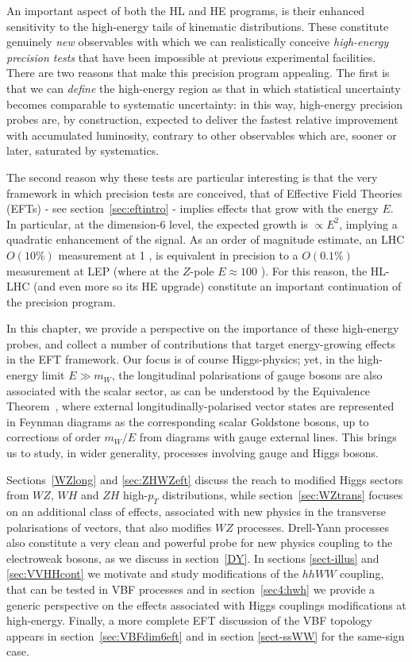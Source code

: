 An important aspect of both the HL and HE programs, is their enhanced sensitivity to the high-energy tails of kinematic distributions.  
These constitute genuinely \emph{new} observables with which we can realistically  conceive \emph{high-energy precision tests} that have been impossible at previous experimental facilities.
 There are two reasons that make this precision program appealing. The first is that we can \emph{define} the high-energy region as that in which statistical uncertainty becomes comparable to systematic uncertainty: in this way, high-energy precision probes are, by construction, expected to deliver the fastest relative improvement with accumulated luminosity, contrary to other observables which are, sooner or later, saturated by systematics.

The second reason why these tests are particular interesting is that the very framework in which precision tests are conceived, that of Effective Field Theories (EFTs) -   see section~\ref{sec:eftintro} -  implies effects that grow with the energy $E$. In particular, at the dimension-6 level, the expected growth is $\propto E^2$, implying a quadratic enhancement of the signal. 
As an order of magnitude estimate, an LHC $O(10\%)$ measurement at 1 \UTeV, is equivalent in precision to a $O(0.1\%)$ measurement at LEP (where at the $Z$-pole $E\approx 100$ \UGeV). For this reason, the HL-LHC (and even more so its HE upgrade) constitute an important continuation of the precision program. 

In this chapter, we provide a perspective on the importance of these high-energy probes, and collect a number of contributions that target energy-growing effects in the EFT framework.
Our focus is of course Higgs-physics; yet, in the  high-energy  limit $E\gg m_{W}$, the longitudinal polarisations of gauge bosons are also associated with the scalar sector, as can be understood by the Equivalence Theorem~\cite{Chanowitz:1985hj,Wulzer:2013mza}, where external longitudinally-polarised vector states are represented in Feynman diagrams as the corresponding
scalar Goldstone bosons, up to corrections of order $m_W/E$ from diagrams with gauge external lines.
This brings us to study, in wider generality, processes involving gauge  and Higgs bosons. %

Sections~\ref{WZlong} and \ref{sec:ZHWZeft} discuss the reach to modified Higgs sectors from $WZ$, $WH$ and $ZH$ high-$p_T$
distributions, while section~\ref{sec:WZtrans} focuses on an additional class of effects, associated with new physics in the transverse polarisations of vectors, that also modifies $WZ$ processes. 
Drell-Yann processes also constitute a very clean and powerful probe for new physics coupling to the electroweak bosons, as we discuss in section~\ref{DY}. In sections \ref{sect-illus} and \ref{sec:VVHHcont} we motivate and study modifications of the $hhWW$ coupling, that can be tested in VBF processes
and in section~\ref{sec4:hwh} we provide a generic perspective on the effects associated with  Higgs couplings modifications at high-energy.
Finally, a more complete EFT discussion of the VBF topology appears in section~\ref{sec:VBFdim6eft} and in section \ref{sect-ssWW} for the same-sign case.
